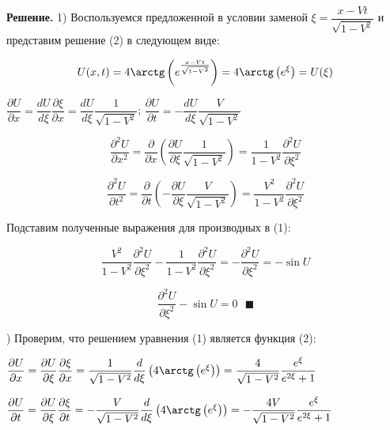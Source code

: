 \documentclass[a4paper, 12pt]{article}
\begin{document}
	\quad \textbf{Решение.} 1) Воспользуемся предложенной в условии заменой \newline $\xi = \dfrac{x-Vt}{\sqrt{1-V^2}}$ и представим решение (2) в следующем виде: 
	
	\begin{equation}
		U(x, t) = 4\arctg\left(e^{\frac{x-Vt}{\sqrt{1-V^2}}}\right) = 4\arctg\left(e^{\xi}\right) = U(\xi) 
	\end{equation}
	
	\begin{center}
		$\dfrac{\partial U}{\partial x} = \dfrac{d U}{d \xi}\dfrac{\partial \xi}{\partial x} = \dfrac{d U}{d \xi} \dfrac{1}{\sqrt{1 - V^2}}$; $\dfrac{\partial U}{\partial t} = -\dfrac{d U}{d \xi}\dfrac{V}{\sqrt{1 - V^2}}$
	\end{center}
	
	\begin{equation} 
		\dfrac{\partial^2 U}{\partial x^2} = \dfrac{\partial }{\partial x}\left( \dfrac{\partial U}{\partial \xi} \dfrac{1}{\sqrt{1 - V^2}}\right) = \dfrac{1}{1 - V^2} \dfrac{\partial^2 U}{\partial \xi^2}
	\end{equation}
	
	\begin{equation}
		\dfrac{\partial^2 U}{\partial t^2} = \dfrac{\partial}{\partial t} \left( -\dfrac{\partial U}{\partial \xi} \dfrac{V}{\sqrt{1-V^2}}\right) = \dfrac{V^2}{1-V^2}\dfrac{\partial^2 U}{\partial \xi^2}
	\end{equation}
	
	\quad Подставим полученные выражения для производных в (1): 
	
	\begin{equation}
		\dfrac{V^2}{1-V^2}\dfrac{\partial^2 U}{\partial \xi^2 } - \dfrac{1}{1-V^2}\dfrac{\partial^2 U}{\partial \xi^2} = -\dfrac{\partial^2 U}{\partial \xi^2} = -\sin U
	\end{equation}
	
	\begin{equation}
		\dfrac{\partial^2 U }{\partial \xi^2} - \sin U = 0 \text{ } \blacksquare
	\end{equation}
	
	) Проверим, что решением уравнения (1) является функция (2):
	
	\begin{center}
		$\dfrac{\partial U}{\partial x} = \dfrac{\partial U}{\partial \xi} \dfrac{\partial \xi}{\partial x} = \dfrac{1}{\sqrt{1-V^2}}\dfrac{d}{d\xi} \left( 4\arctg\left(e^{\xi}\right) \right) = \dfrac{4}{\sqrt{1-V^2}}\dfrac{e^\xi}{e^{2\xi}+1}$
		
		$\dfrac{\partial U}{\partial t} = \dfrac{\partial U}{\partial \xi} \dfrac{\partial \xi}{\partial t} = -\dfrac{V}{\sqrt{1-V^2}}\dfrac{d}{d\xi} \left(4\arctg\left(e^\xi\right)\right) = -\dfrac{4V}{\sqrt{1-V^2}} \dfrac{e^\xi}{e^{2\xi} + 1}$
	\end{center}
	
\end{document}
